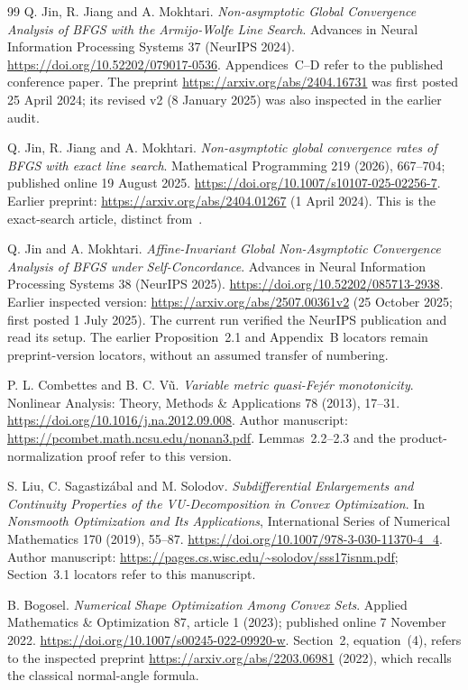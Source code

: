 \begin{thebibliography}{99}
Q. Jin, R. Jiang and A. Mokhtari. \emph{Non-asymptotic Global Convergence Analysis of BFGS with the Armijo-Wolfe Line Search}. Advances in Neural Information Processing Systems 37 (NeurIPS 2024). \url{https://doi.org/10.52202/079017-0536}. Appendices~C--D refer to the published conference paper. The preprint \url{https://arxiv.org/abs/2404.16731} was first posted 25 April 2024; its revised v2 (8 January 2025) was also inspected in the earlier audit.

Q. Jin, R. Jiang and A. Mokhtari. \emph{Non-asymptotic global convergence rates of BFGS with exact line search}. Mathematical Programming 219 (2026), 667--704; published online 19 August 2025. \url{https://doi.org/10.1007/s10107-025-02256-7}. Earlier preprint: \url{https://arxiv.org/abs/2404.01267} (1 April 2024). This is the exact-search article, distinct from~\cite{FND_JJM24AW}.

Q. Jin and A. Mokhtari. \emph{Affine-Invariant Global Non-Asymptotic Convergence Analysis of BFGS under Self-Concordance}. Advances in Neural Information Processing Systems 38 (NeurIPS 2025). \url{https://doi.org/10.52202/085713-2938}. Earlier inspected version: \url{https://arxiv.org/abs/2507.00361v2} (25 October 2025; first posted 1 July 2025). The current run verified the NeurIPS publication and read its setup. The earlier Proposition~2.1 and Appendix~B locators remain preprint-version locators, without an assumed transfer of numbering.

P. L. Combettes and B. C. V\~u. \emph{Variable metric quasi-Fej\'er monotonicity}. Nonlinear Analysis: Theory, Methods \& Applications 78 (2013), 17--31. \url{https://doi.org/10.1016/j.na.2012.09.008}. Author manuscript: \url{https://pcombet.math.ncsu.edu/nonan3.pdf}. Lemmas~2.2--2.3 and the product-normalization proof refer to this version.

S. Liu, C. Sagastiz\'abal and M. Solodov. \emph{Subdifferential Enlargements and Continuity Properties of the VU-Decomposition in Convex Optimization}. In \emph{Nonsmooth Optimization and Its Applications}, International Series of Numerical Mathematics 170 (2019), 55--87. \url{https://doi.org/10.1007/978-3-030-11370-4_4}. Author manuscript: \url{https://pages.cs.wisc.edu/~solodov/sss17isnm.pdf}; Section~3.1 locators refer to this manuscript.

B. Bogosel. \emph{Numerical Shape Optimization Among Convex Sets}. Applied Mathematics \& Optimization 87, article 1 (2023); published online 7 November 2022. \url{https://doi.org/10.1007/s00245-022-09920-w}. Section~2, equation~(4), refers to the inspected preprint \url{https://arxiv.org/abs/2203.06981} (2022), which recalls the classical normal-angle formula.


\end{thebibliography}
